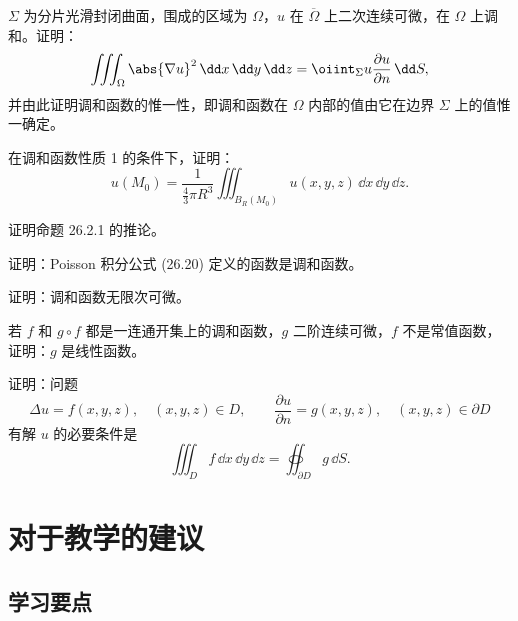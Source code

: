 \begin{xexercise}[3]
$\Sigma$ 为分片光滑封闭曲面，围成的区域为 $\Omega$，$u$ 在 $\overline\Omega$ 上二次连续可微，在 $\Omega$ 上调和。证明：
\[
  \iiint_\Omega\abs{\nabla u}^2\,\dd x\,\dd y\,\dd z
  =\oiint_\Sigma u\frac{\partial u}{\partial n}\,\dd S,
\]
并由此证明调和函数的惟一性，即调和函数在 $\Omega$ 内部的值由它在边界 $\Sigma$ 上的值惟一确定。
\end{xexercise}

\begin{xexercise}[4]
在调和函数性质 1 的条件下，证明：
\[
  u(M_0)=\frac{1}{\frac43\pi R^3}\iiint_{B_R(M_0)}u(x,y,z)\,\dd x\,\dd y\,\dd z.
\]
\end{xexercise}

\begin{xexercise}[5]
证明命题 26.2.1 的推论。
\end{xexercise}

\begin{xexercise}[6]
证明：Poisson 积分公式 (26.20) 定义的函数是调和函数。
\end{xexercise}

\begin{xexercise}[7]
证明：调和函数无限次可微。
\end{xexercise}

\begin{xexercise}[8]
若 $f$ 和 $g\circ f$ 都是一连通开集上的调和函数，$g$ 二阶连续可微，$f$ 不是常值函数，证明：$g$ 是线性函数。
\end{xexercise}

\begin{xexercise}[9]
证明：问题
\[
  \Delta u=f(x,y,z),\quad (x,y,z)\in D,
  \qquad
  \frac{\partial u}{\partial n}=g(x,y,z),\quad (x,y,z)\in\partial D
\]
有解 $u$ 的必要条件是
\[
  \iiint_D f\,\dd x\,\dd y\,\dd z=\oiint_{\partial D}g\,\dd S.
\]
\end{xexercise}

\section{对于教学的建议}

\subsection{学习要点}

